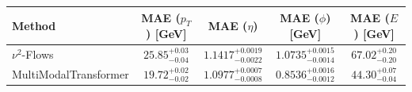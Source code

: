     \begin{tabular}{lcccc}
        \toprule
        Method & MAE ($p_T$) [GeV] & MAE ($\eta$) & MAE ($\phi$) [GeV] & MAE ($E$) [GeV] \\
        \midrule
        $\nu^2$-Flows & $25.85^{+0.03}_{-0.04}$ & $1.1417^{+0.0019}_{-0.0022}$ & $1.0735^{+0.0015}_{-0.0014}$ & $67.02^{+0.20}_{-0.20}$ \\
        MultiModalTransformer & $19.72^{+0.02}_{-0.02}$ & $1.0977^{+0.0007}_{-0.0008}$ & $0.8536^{+0.0016}_{-0.0012}$ & $44.30^{+0.07}_{-0.04}$ \\
        \bottomrule
    \end{tabular}